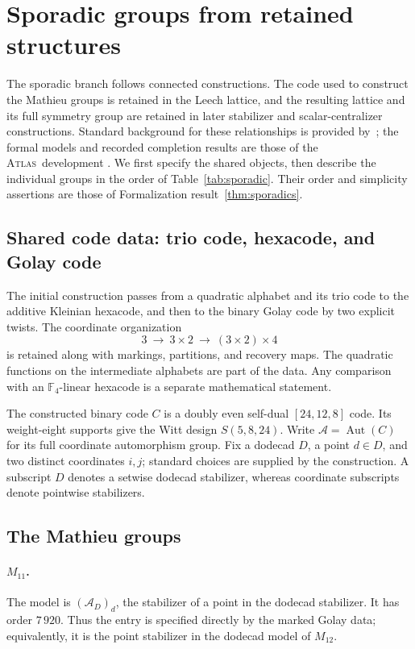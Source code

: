 \documentclass[11pt]{article}
\numberwithin{equation}{section}
\theoremstyle{definition}
\newcommand{\F}{\mathbb F}
\newcommand{\Aut}{\operatorname{Aut}}
\newcommand{\atlas}{\textsc{Atlas}}
\begin{document}
\section{Sporadic groups from retained structures}\label{sec:sporadic}

The sporadic branch follows connected constructions. The code used to
construct the Mathieu groups is retained in the Leech lattice, and the
resulting lattice and its full symmetry group are retained in later
stabilizer and scalar-centralizer constructions. Standard background
for these relationships is provided by~\cite{CS}; the formal models and
recorded completion results are those of the \atlas\ development
\cite{AtlasSoftware}. We first specify the shared objects, then describe
the individual groups in the order of Table~\ref{tab:sporadic}.
Their order and simplicity assertions are those of Formalization
result~\ref{thm:sporadics}.

\subsection{Shared code data: trio code, hexacode, and Golay code}\label{sec:golay-data}

The initial construction passes from a quadratic alphabet and its trio
code to the additive Kleinian hexacode, and then to the binary Golay code
by two explicit twists. The coordinate organization
\[
 3\ \longrightarrow\ 3\times2\ \longrightarrow\ (3\times2)\times4
\]
is retained along with markings, partitions, and recovery maps. The
quadratic functions on the intermediate alphabets are part of the data.
Any comparison with an $\F_4$-linear hexacode is a separate mathematical
statement.

The constructed binary code $C$ is a doubly even self-dual
$[24,12,8]$ code. Its weight-eight supports give the Witt design
$S(5,8,24)$. Write $\mathcal A=\Aut(C)$ for its full coordinate
automorphism group. Fix a dodecad $D$, a point $d\in D$, and two
distinct coordinates $i,j$; standard choices are supplied by the
construction. A subscript $D$ denotes a setwise dodecad stabilizer,
whereas coordinate subscripts denote pointwise stabilizers.

\subsection{The Mathieu groups}

\paragraph{\texorpdfstring{$M_{11}$}{M11}.}
The model is $(\mathcal A_D)_d$, the stabilizer of a point in the
dodecad stabilizer. It has order $7\,920$. Thus the entry is specified
directly by the marked Golay data; equivalently, it is the point
stabilizer in the dodecad model of $M_{12}$.
\end{document}
